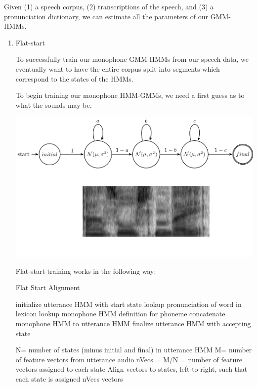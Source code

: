 \documentclass[10pt,a4paper]{article}
\begin{document}
\begin{enumerate}
Given (1) a speech corpus, (2) transcriptions of the speech, and (3) a pronunciation dictionary, we can estimate all the parameters of our GMM-HMMs.

  \begin{enumerate}
  \item Flat-start 

    To successfully train our monophone GMM-HMMs from our speech data, we eventually want to have the entire corpus split into segments which correspond to the states of the HMMs.
    
    To begin training our monophone HMM-GMMs, we need a first guess as to what the sounds may be.

    \begin{center}
      \includegraphics[width=.9\textwidth,keepaspectratio]{figs/flat-start.png}
    \end{center}

    Flat-start training works in the following way:

    
    \begin{algorithm}
      \caption{Flat Start Alignment}
      \begin{algorithmic}[1]
        \State initialize utterance HMM with start state
        \State lookup pronunciation of word in lexicon
        \State lookup monophone HMM definition for phoneme
        \State concatenate monophone HMM to utterance HMM
        \EndFor
        \EndFor
        \State finalize utterance HMM with accepting state
        \EndFor
        \EndProcedure

        \State N= number of states (minus initial and final) in utterance HMM
        \State M= number of feature vectors from utterance audio
        \State nVecs = M/N = number of feature vectors assigned to each state
        \State Align vectors to states, left-to-right, such that each state is assigned nVecs vectors
        \EndFor
        \EndProcedure
      \end{algorithmic}
    \end{algorithm}



\end{enumerate}
\end{enumerate}
\end{document}
